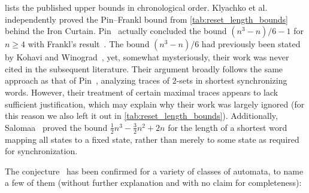  lists the published upper bounds in chronological order.
Klyachko et al.~\cite{KlyachkoRystsovSpivak87} independently proved the Pin--Frankl bound from \cref{tab:reset_length_bounds} behind the Iron Curtain. Pin~\cite{Pin83a} actually concluded the bound $(n^3 - n)/6 - 1$ for $n \ge 4$
with Frankl's result~\cite{Frankl82}. 
The bound $(n^3 - n)/6$ had previously been stated by Kohavi and Winograd~\cite{KOHAVI1971197,DBLP:journals/jcss/KohaviW73}, yet, somewhat mysteriously, their work was never cited in the subsequent literature. Their argument broadly follows the same approach as that of Pin~\cite{Pin83a}, analyzing traces of $2$-sets in shortest synchronizing words. However, their treatment of certain maximal traces appears to lack sufficient justification, which may explain why their work was largely ignored (for this reason we also left
it out in \cref{tab:reset_length_bounds}).
Additionally, Salomaa~\cite[Thm.~4]{DBLP:journals/tcs/Salomaa03} proved the bound
$\frac{1}{2}n^3 - \frac{3}{2}n^2 + 2n$
for the length of a shortest word mapping all states to a fixed state, rather than merely to some state as required for synchronization.

The \Cerny conjecture~\cite{Cer64} has been confirmed
for a variety of classes of automata, to name a few of them 
(without further explanation and with no claim for completeness):

